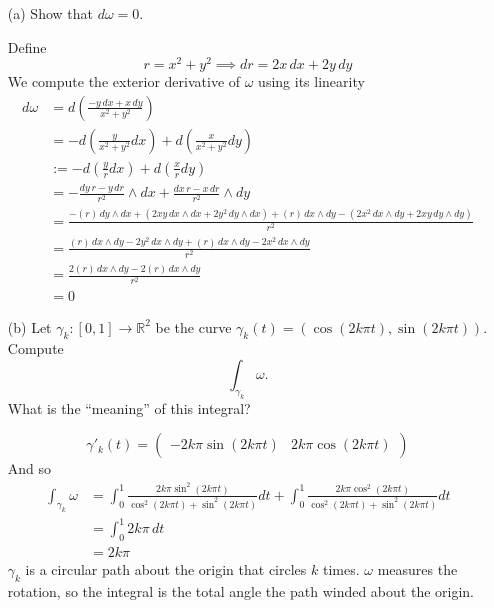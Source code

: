 \documentclass[11pt]{article}
\begin{document}
\begin{enumerate}
    \item[(a)] Show that \(d\omega = 0\).
    \begin{solution}
Define 
\[r = x^2 + y^2 \implies dr = 2x \,dx + 2y\,dy\]
        We compute the exterior derivative of $\omega$ using its linearity
\begin{align*}
    d\omega &= d\left(\frac{-y\,dx + x\,dy}{x^2 + y^2}\right)\\
    &= -d\left(\frac{y}{x^2+ y^2}dx\right) + d\left(\frac{x}{x^2 + y^2} dy\right)\\
    &:=-d\left(\frac{y}{r}dx\right) + d\left(\frac{x}{r} dy\right)\\ 
    &= -\frac{dy \,r - y\,dr}{r^2} \wedge dx + \frac{dx\, r - x \,dr}{r^2}\wedge dy\\
    &= \frac{-(r)\,dy \wedge dx + (2xy \,dx \wedge dx + 2y^2\, dy \wedge dx) + (r)\, dx \wedge dy - (2x^2 \,dx \wedge dy + 2xy\, dy \wedge dy)}{r^2}\\
    &= \frac{(r)\,dx \wedge dy -2y^2\, dx \wedge dy + (r)\, dx \wedge dy - 2x^2 \,dx \wedge dy }{r^2}\\
    &= \frac{2(r)\, dx \wedge dy - 2(r)\, dx \wedge dy}{r^2}\\
    &= 0
\end{align*}
    \end{solution}


    
    \item[(b)] Let \(\gamma_k : [0, 1] \to \mathbb{R}^2\) be the curve \(\gamma_k(t) = (\cos(2k\pi t), \sin(2k\pi t))\). Compute
    \[
    \int_{\gamma_k} \omega.
    \]
    What is the “meaning” of this integral?
    \begin{solution}
        \[\gamma'_k(t) = \begin{pmatrix}
            -2k \pi \sin(2k \pi t) & 2k\pi\cos(2k\pi t)
        \end{pmatrix}\]
        And so 
        \begin{align*}
            \int_{\gamma_k}\omega &= \int_0^1 \frac{2k\pi \sin^2(2k \pi t)}{\cos^2(2k\pi t) + \sin^2(2k\pi t)}dt + \int_0^1\frac{2k \pi \cos^2(2k\pi t)}{\cos^2(2k\pi t) + \sin^2(2k\pi t)}dt\\
            &= \int_0^1 2k\pi \,dt\\
            &= 2k \pi
        \end{align*}
        $\gamma_k$ is a circular path about the origin that circles $k$ times. $\omega$ measures the rotation, so the integral is the total angle the path winded about the origin. 
    \end{solution}
\end{enumerate}
\end{document}
